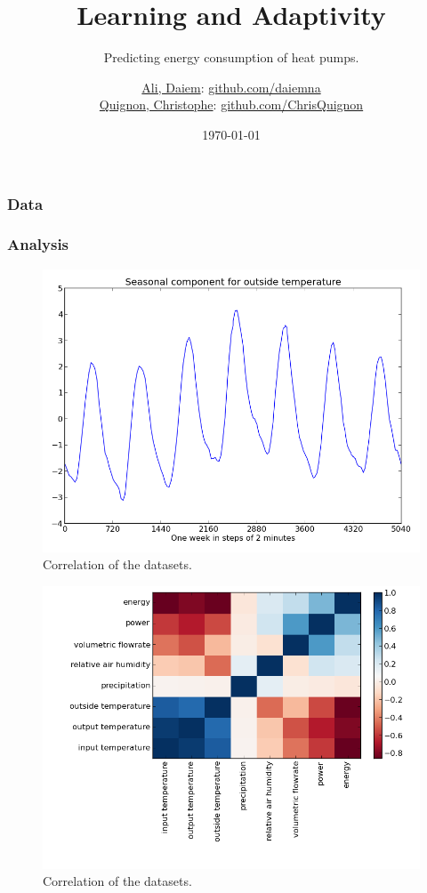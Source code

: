 \documentclass{beamer}
\begin{document}
\title{Learning and Adaptivity}
\subtitle{Predicting energy consumption of heat pumps.}
\author{
  \href{daiem.ali@smail.inf.h-brs.de}{Ali, Daiem}: \href{https://github.com/daiemna}{github.com/daiemna}\\
  \href{christophe.quignon@smail.inf.h-brs.de}{Quignon, Christophe}: \href{https://github.com/ChrisQuignon}{github.com/ChrisQuignon}
} 
\date{\today}

\begin{frame}
\titlepage{}
\end{frame}
	

\begin{frame}
\frametitle{Data}


\end{frame}


\begin{frame}
\frametitle{Analysis}

\begin{figure}[H]
  \includegraphics[width=0.6\linewidth]{img/season-outside_temperature.png}
  \caption{Correlation of the datasets.}
  \label{fig:correlation}
\end{figure}

\begin{figure}[H]
  \includegraphics[width=0.6\linewidth]{img/correlation.png}
  \caption{Correlation of the datasets.}
  \label{fig:correlation}
\end{figure}

\end{frame}
\end{document}

